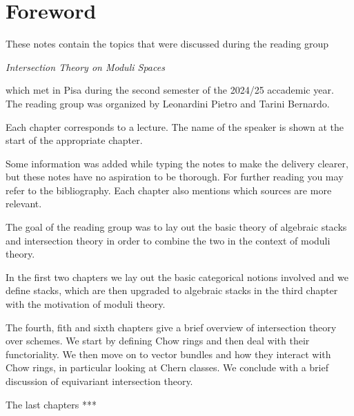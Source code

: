 \chapter*{Foreword}

These notes contain the topics that were discussed during the reading group
\begin{center}
    \textit{Intersection Theory on Moduli Spaces}
\end{center}
which met in Pisa during the second semester of the 2024/25 accademic year.
The reading group was organized by Leonardini Pietro and Tarini Bernardo. 

Each chapter corresponds to a lecture. The name of the speaker is shown at the start of the appropriate chapter.


Some information was added while typing the notes to make the delivery clearer, but these notes have no aspiration to be thorough. For further reading you may refer to the bibliography. Each chapter also mentions which sources are more relevant.


\medskip


The goal of the reading group was to lay out the basic theory of algebraic stacks and intersection theory in order to combine the two in the context of moduli theory.

In the first two chapters we lay out the basic categorical notions involved and we define stacks, which are then upgraded to algebraic stacks in the third chapter with the motivation of moduli theory.

The fourth, fith and sixth chapters give a brief overview of intersection theory over schemes. We start by defining Chow rings and then deal with their functoriality. We then move on to vector bundles and how they interact with Chow rings, in particular looking at Chern classes. We conclude with a brief discussion of equivariant intersection theory.

The last chapters ***



